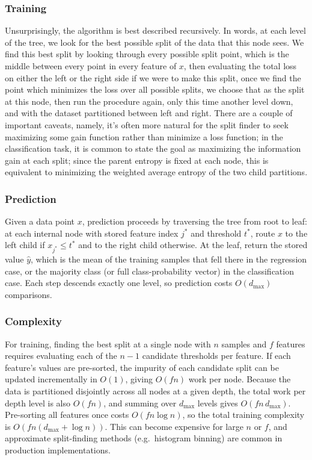 \documentclass[a4paper, 11pt]{article}
\begin{document}
\subsubsection{Training}

Unsurprisingly, the algorithm is best described recursively. In
words, at each level of the tree, we look for the best possible split
of the data that this node sees. We find this best split by looking
through every possible split point, which is the middle between every
point in every feature of $x$, then evaluating the total loss on
either the left or the right side if we were to make this split, once
we find the point which minimizes the loss over all possible splits,
we choose that as the split at this node, then run the procedure
again, only this time another level down, and with the dataset
partitioned between left and right. There are a couple of important
caveats, namely, it's often more natural for the split finder to seek
maximizing some gain function rather than minimize a loss function;
in the classification task, it is common to state the goal as
maximizing the information gain at each split; since the parent
entropy is fixed at each node, this is equivalent to minimizing
the weighted average entropy of the two child partitions.

\subsubsection{Prediction}

Given a data point $x$, prediction proceeds by traversing the tree
from root to leaf: at each internal node with stored feature index
$j^*$ and threshold $t^*$, route $x$ to the left child if
$x_{j^*} \leq t^*$ and to the right child otherwise. At the leaf,
return the stored value $\hat{y}$, which is the mean of the training
samples that fell there in the regression case, or the majority class
(or full class-probability vector) in the classification case. Each
step descends exactly one level, so prediction costs $O(d_{\max})$
comparisons.

\subsubsection{Complexity}

For training, finding the best split at a single node with $n$ samples
and $f$ features requires evaluating each of the $n - 1$ candidate
thresholds per feature. If each feature's values are pre-sorted, the
impurity of each candidate split can be updated incrementally in
$O(1)$, giving $O(fn)$ work per node. Because the data is partitioned
disjointly across all nodes at a given depth, the total work per depth
level is also $O(fn)$, and summing over $d_{\max}$ levels gives
$O(fn \, d_{\max})$. Pre-sorting all features once costs
$O(fn \log n)$, so the total training complexity is
$O\!\left(fn(d_{\max} + \log n)\right)$.
This can become expensive for large $n$ or $f$, and approximate
split-finding methods (e.g.\ histogram binning) are common in
production implementations.
\end{document}
